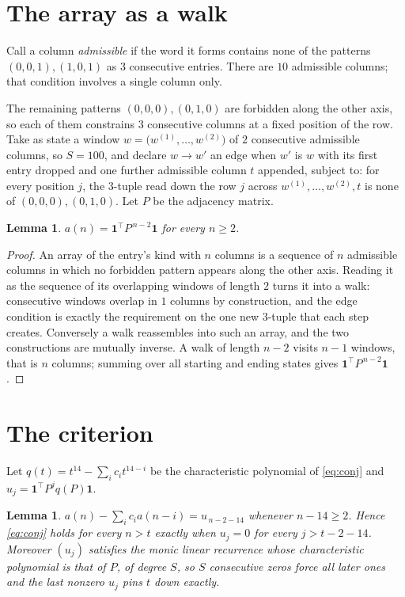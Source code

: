 \documentclass[11pt,a4paper]{article}
\theoremstyle{plain}
\newtheorem{lemma}[theorem]{Lemma}
\theoremstyle{definition}
\begin{document}
\section{The array as a walk}

Call a column \emph{admissible} if the word it forms contains none of the patterns
$(0,0,1), (1,0,1)$ as $3$ consecutive entries. There are $10$ admissible columns; that condition
involves a single column only.

The remaining patterns $(0,0,0), (0,1,0)$ are forbidden along the other axis, so each of them
constrains $3$ consecutive columns at a fixed position of the row. Take as state a
window $w=\bigl(w^{(1)},\dots,w^{(2)}\bigr)$ of $2$ consecutive admissible
columns, so $S=100$, and declare $w\to w'$ an edge when $w'$ is $w$ with its first entry
dropped and one further admissible column $t$ appended, subject to: for every position
$j$, the $3$-tuple read down the row $j$ across $w^{(1)},\dots,w^{(2)},t$
is none of $(0,0,0), (0,1,0)$. Let $P$ be the adjacency matrix.

\begin{lemma}\label{lem:walk}
$a(n)=\mathbf{1}^{\!\top}P^{\,n-2}\mathbf{1}$ for every $n\ge2$.
\end{lemma}

\begin{proof}
An array of the entry's kind with $n$ columns is a sequence of $n$ admissible columns in
which no forbidden pattern appears along the other axis. Reading it as the sequence of its
overlapping windows of length $2$ turns it into a walk: consecutive windows overlap in
$1$ columns by construction, and the edge condition is exactly the requirement on the one
new $3$-tuple that each step creates. Conversely a walk reassembles into such an array,
and the two constructions are mutually inverse. A walk of length $n-2$ visits $n-1$
windows, that is $n$ columns; summing over all starting and ending states gives
$\mathbf{1}^{\!\top}P^{\,n-2}\mathbf{1}$.
\end{proof}

\section{The criterion}

Let $q(t)=t^{14}-\sum_i c_i t^{14-i}$ be the characteristic polynomial of
\eqref{eq:conj} and $u_j=\mathbf{1}^{\!\top}P^{j}q(P)\mathbf{1}$.

\begin{lemma}\label{lem:crit}
$a(n)-\sum_i c_i a(n-i)=u_{\,n-2-14}$ whenever $n-14\ge2$. Hence
\eqref{eq:conj} holds for every $n>t$ exactly when $u_j=0$ for every
$j>t-2-14$. Moreover $(u_j)$ satisfies the monic linear recurrence whose
characteristic polynomial is that of $P$, of degree $S$, so $S$ consecutive zeros force all
later ones and the last nonzero $u_j$ pins $t$ down exactly.
\end{lemma}
\end{document}
